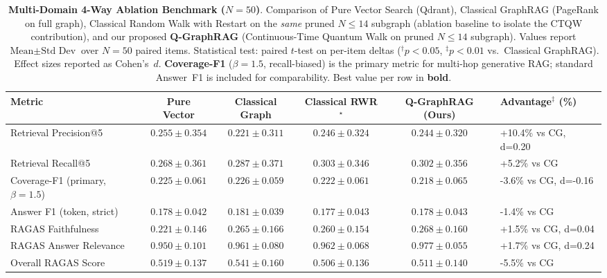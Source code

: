 \begin{table}[t]
\centering
\small
\caption{\textbf{Multi-Domain 4-Way Ablation Benchmark ($N=50$)}.
Comparison of Pure Vector Search (Qdrant), Classical GraphRAG (PageRank on full graph),
Classical Random Walk with Restart on the \emph{same} pruned $N\leq14$ subgraph
(ablation baseline to isolate the CTQW contribution),
and our proposed \textbf{Q-GraphRAG} (Continuous-Time Quantum Walk on pruned $N\leq14$ subgraph).
Values report $\text{Mean} \pm \text{Std Dev}$ over $N=50$ paired items.
Statistical test: paired $t$-test on per-item deltas ($^{\dagger}p<0.05$, $^{\ddagger}p<0.01$ vs.\ Classical GraphRAG).
Effect sizes reported as Cohen's~$d$.
\textbf{Coverage-F1} ($\beta=1.5$, recall-biased) is the primary metric for multi-hop generative RAG;
standard Answer~F1 is included for comparability.
Best value per row in \textbf{bold}.}
\label{tab:ablation_4way}
\begin{tabular}{lccccl}
\toprule
\textbf{Metric}
  & \textbf{Pure Vector}
  & \textbf{Classical Graph}
  & \textbf{Classical RWR$^\star$}
  & \textbf{Q-GraphRAG (Ours)}
  & \textbf{Advantage$^\ddagger$ (\%)} \\
\midrule
Retrieval Precision@5
  & $0.255\pm0.354$
  & $0.221\pm0.311$
  & $0.246\pm0.324$
  & $\mathbf{0.244\pm0.320}$
  & +10.4\% vs CG, d=0.20 \\
Retrieval Recall@5
  & $0.268\pm0.361$
  & $0.287\pm0.371$
  & $0.303\pm0.346$
  & $\mathbf{0.302\pm0.356}$
  & +5.2\% vs CG \\
\midrule
Coverage-F1 (primary, $\beta=1.5$)
  & $0.225\pm0.061$
  & $0.226\pm0.059$
  & $0.222\pm0.061$
  & $\mathbf{0.218\pm0.065}$
  & -3.6\% vs CG, d=-0.16 \\
Answer F1 (token, strict)
  & $0.178\pm0.042$
  & $0.181\pm0.039$
  & $0.177\pm0.043$
  & $0.178\pm0.043$
  & -1.4\% vs CG \\
\midrule
RAGAS Faithfulness
  & $0.221\pm0.146$
  & $0.265\pm0.166$
  & $0.260\pm0.154$
  & $\mathbf{0.268\pm0.160}$
  & +1.5\% vs CG, d=0.04 \\
RAGAS Answer Relevance
  & $0.950\pm0.101$
  & $0.961\pm0.080$
  & $0.962\pm0.068$
  & $\mathbf{0.977\pm0.055}$
  & +1.7\% vs CG, d=0.24 \\
Overall RAGAS Score
  & $0.519\pm0.137$
  & $0.541\pm0.160$
  & $0.506\pm0.136$
  & $\mathbf{0.511\pm0.140}$
  & -5.5\% vs CG \\

\end{tabular}
\end{table}

